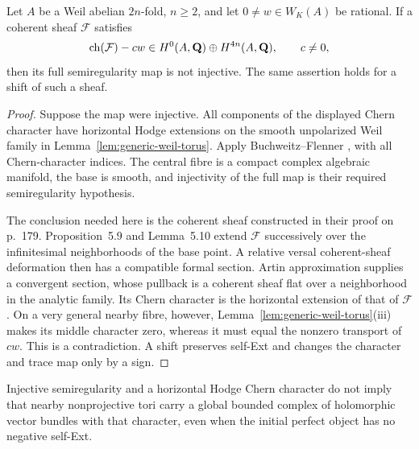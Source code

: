 \begin{proposition}
\label{prop:coherent-pure-weil}
Let $A$ be a Weil abelian $2n$-fold, $n\ge2$, and let
$0\ne w\in W_K(A)$ be rational.  If a coherent sheaf
$\mathcal F$ satisfies
\[
 \operatorname{ch}(\mathcal F)-cw
   \in H^0(A,\mathbf Q)\oplus H^{4n}(A,\mathbf Q),\qquad c\ne0,
\]
then its full semiregularity map is not injective.  The same
assertion holds for a shift of such a sheaf.
\end{proposition}

\begin{proof}
Suppose the map were injective.  All components of the displayed
Chern character have horizontal Hodge extensions on the smooth
unpolarized Weil family in Lemma~\ref{lem:generic-weil-torus}.
Apply Buchweitz--Flenner \cite[Theorem~5.1, pp.~174--175]{BF},
with all Chern-character indices.  The central fibre is a compact
complex algebraic manifold, the base is smooth, and injectivity
of the full map is their required semiregularity hypothesis.

The conclusion needed here is the coherent sheaf constructed
in their proof on p.~179.  Proposition~5.9 and Lemma~5.10
extend $\mathcal F$ successively over the infinitesimal
neighborhoods of the base point.  A relative versal coherent-sheaf
deformation then has a compatible formal section.  Artin
approximation supplies a convergent section, whose pullback is
a coherent sheaf flat over a neighborhood in the analytic
family.  Its Chern character is the horizontal extension of
that of $\mathcal F$.  On a very general nearby fibre, however,
Lemma~\ref{lem:generic-weil-torus}(iii) makes its middle character
zero, whereas it must equal the nonzero transport of $cw$.
This is a contradiction.  A shift preserves self-Ext and changes
the character and trace map only by a sign.
\end{proof}

\begin{proposition}
\label{prop:analytic-strictification}
Injective semiregularity and a horizontal Hodge Chern character
do not imply that nearby nonprojective tori carry a global
bounded complex of holomorphic vector bundles with that character,
even when the initial perfect object has no negative self-Ext.
\end{proposition}

